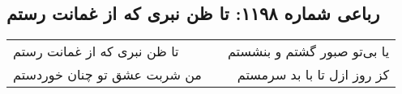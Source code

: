 \begin{center}
\section*{رباعی شماره ۱۱۹۸: تا ظن نبری که از غمانت رستم}
\label{sec:1198}
\begin{longtable}{l p{0.5cm} r}
تا ظن نبری که از غمانت رستم
&&
یا بی‌تو صبور گشتم و بنشستم
\\
من شربت عشق تو چنان خوردستم
&&
کز روز ازل تا با بد سرمستم
\\
\end{longtable}
\end{center}
